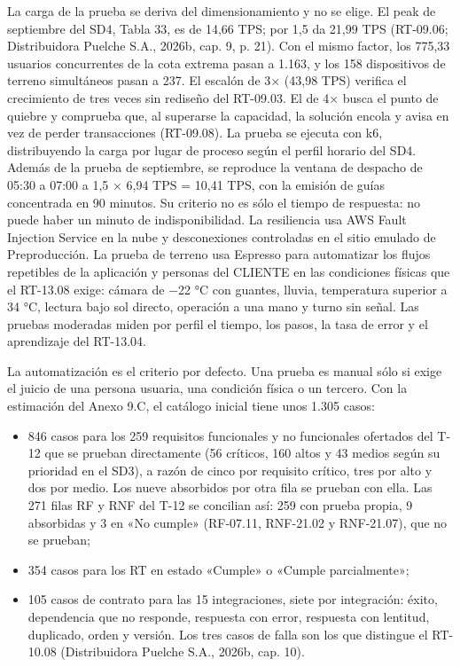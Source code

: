 La carga de la prueba se deriva del dimensionamiento y no se elige. El peak de septiembre del SD4, Tabla 33, es de 14,66 TPS; por 1,5 da 21,99 TPS (RT-09.06; Distribuidora Puelche S.A., 2026b, cap. 9, p. 21). Con el mismo factor, los 775,33 usuarios concurrentes de la cota extrema pasan a 1.163, y los 158 dispositivos de terreno simultáneos pasan a 237. El escalón de 3× (43,98 TPS) verifica el crecimiento de tres veces sin rediseño del RT-09.03. El de 4× busca el punto de quiebre y comprueba que, al superarse la capacidad, la solución encola y avisa en vez de perder transacciones (RT-09.08). La prueba se ejecuta con k6, distribuyendo la carga por lugar de proceso según el perfil horario del SD4. Además de la prueba de septiembre, se reproduce la ventana de despacho de 05:30 a 07:00 a 1,5 × 6,94 TPS = 10,41 TPS, con la emisión de guías concentrada en 90 minutos. Su criterio no es sólo el tiempo de respuesta: no puede haber un minuto de indisponibilidad. La resiliencia usa AWS Fault Injection Service en la nube y desconexiones controladas en el sitio emulado de Preproducción. La prueba de terreno usa Espresso para automatizar los flujos repetibles de la aplicación y personas del CLIENTE en las condiciones físicas que el RT-13.08 exige: cámara de −22 °C con guantes, lluvia, temperatura superior a 34 °C, lectura bajo sol directo, operación a una mano y turno sin señal. Las pruebas moderadas miden por perfil el tiempo, los pasos, la tasa de error y el aprendizaje del RT-13.04.

La automatización es el criterio por defecto. Una prueba es manual sólo si exige el juicio de una persona usuaria, una condición física o un tercero. Con la estimación del Anexo 9.C, el catálogo inicial tiene unos 1.305 casos:

\begin{itemize}
\item 846 casos para los 259 requisitos funcionales y no funcionales ofertados del T-12 que se prueban directamente (56 críticos, 160 altos y 43 medios según su prioridad en el SD3), a razón de cinco por requisito crítico, tres por alto y dos por medio. Los nueve absorbidos por otra fila se prueban con ella. Las 271 filas RF y RNF del T-12 se concilian así: 259 con prueba propia, 9 absorbidas y 3 en «No cumple» (RF-07.11, RNF-21.02 y RNF-21.07), que no se prueban;
\item 354 casos para los RT en estado «Cumple» o «Cumple parcialmente»;
\item 105 casos de contrato para las 15 integraciones, siete por integración: éxito, dependencia que no responde, respuesta con error, respuesta con lentitud, duplicado, orden y versión. Los tres casos de falla son los que distingue el RT-10.08 (Distribuidora Puelche S.A., 2026b, cap. 10).
\end{itemize}

